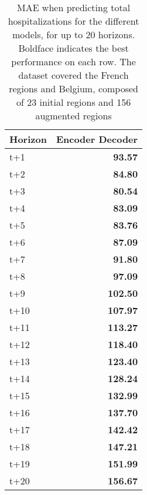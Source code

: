 \begin{table}[H]
\centering
\caption{MAE when predicting total hospitalizations for the different models, for up to 20 horizons. Boldface indicates the best performance on each row. The dataset covered the French regions and Belgium, composed of 23 initial regions and 156 augmented regions }
\label{tab:MAE_comparison}
\begin{tabular}{lr}
\toprule
Horizon &  Encoder Decoder \\
\midrule
t+1  & \textbf{93.57}  \\
t+2  & \textbf{84.80}  \\
t+3  & \textbf{80.54}  \\
t+4  & \textbf{83.09}  \\
t+5  & \textbf{83.76}  \\
t+6  & \textbf{87.09}  \\
t+7  & \textbf{91.80}  \\
t+8  & \textbf{97.09}  \\
t+9  & \textbf{102.50}  \\
t+10  & \textbf{107.97}  \\
t+11  & \textbf{113.27}  \\
t+12  & \textbf{118.40}  \\
t+13  & \textbf{123.40}  \\
t+14  & \textbf{128.24}  \\
t+15  & \textbf{132.99}  \\
t+16  & \textbf{137.70}  \\
t+17  & \textbf{142.42}  \\
t+18  & \textbf{147.21}  \\
t+19  & \textbf{151.99}  \\
t+20  & \textbf{156.67}  \\

\bottomrule
\end{tabular}
\end{table}

